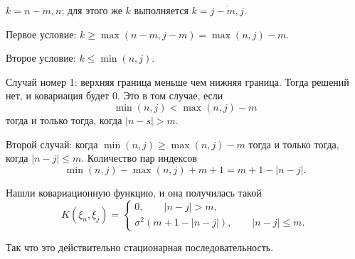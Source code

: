 $k = \overline{n - m, n}$; для этого же $k$ выполняется $k = \overline{j - m, j}$.

Первое условие: $k \geq \max \left( n - m, j - m \right) = \max \left( n, j \right) - m$.

Второе условие: $k \leq \min \left( n, j \right) $.

Случай номер 1: верхняя граница меньше чем нижняя граница.
Тогда решений нет, и ковариация будет 0.
Это в том случае, если
\begin{equation*}
  \min \left( n, j \right) < \max \left( n, j \right) - m
\end{equation*}
тогда и только тогда, когда $ \left| n - s \right| > m$.

Второй случай:
когда $ \min \left( n, j \right) \geq \max \left( n, j \right) - m$ тогда и только тогда,
когда $ \left| n - j \right| \leq m$.
Количество пар индексов
\begin{equation*}
  \min \left( n, j \right) - \max \left( n, j \right) + m + 1 =
  m + 1 - \left| n - j \right|.
\end{equation*}

Нашли ковариационную функцию, и она получилась такой
\begin{equation*}
  K \left( \xi_n, \xi_j \right) =
  \begin{cases}
    0, \qquad \left| n - j \right| > m, \\
    \sigma^2 \left( m + 1 - \left| n - j \right| \right), \qquad \left| n - j \right| \leq m.
  \end{cases}
\end{equation*}

Так что это действительно стационарная последовательность.
